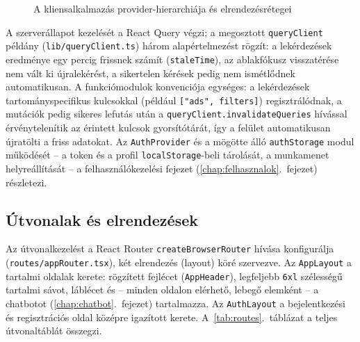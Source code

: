 \begin{figure}[htbp]
	\centering
	\caption{A kliensalkalmazás provider-hierarchiája és elrendezésrétegei}
	\label{fig:provider-fa}
\end{figure}

A szerverállapot kezelését a React Query végzi; a megosztott \texttt{queryClient} példány
(\texttt{lib/queryClient.ts}) három alapértelmezést rögzít: a lekérdezések eredménye egy percig
frissnek számít (\texttt{staleTime}), az ablakfókusz visszatérése nem vált ki újralekérést, a
sikertelen kérések pedig nem ismétlődnek automatikusan. A funkciómodulok konvenciója egységes: a
lekérdezések tartományspecifikus kulcsokkal (például \texttt{["ads", filters]}) regisztrálódnak,
a mutációk pedig sikeres lefutás után a \texttt{queryClient.invalidateQueries} hívással
érvénytelenítik az érintett kulcsok gyorsítótárát, így a felület automatikusan újratölti a friss
adatokat. Az \texttt{AuthProvider} és a mögötte álló \texttt{authStorage} modul működését -- a
token és a profil \texttt{localStorage}-beli tárolását, a munkamenet helyreállítását -- a
felhasználókezelési fejezet (\ref{chap:felhasznalok}.~fejezet) részletezi.

\subsection{Útvonalak és elrendezések}

Az útvonalkezelést a React Router \texttt{createBrowserRouter} hívása konfigurálja
(\texttt{routes/appRouter.tsx}), két elrendezés (layout) köré szervezve. Az \texttt{AppLayout}
a tartalmi oldalak kerete: rögzített fejlécet (\texttt{AppHeader}), legfeljebb \texttt{6xl}
szélességű tartalmi sávot, láblécet és -- minden oldalon elérhető, lebegő elemként -- a
chatbotot (\ref{chap:chatbot}.~fejezet) tartalmazza. Az \texttt{AuthLayout} a bejelentkezési és
regisztrációs oldal középre igazított kerete. A~\ref{tab:routes}.~táblázat a teljes
útvonaltáblát összegzi.


